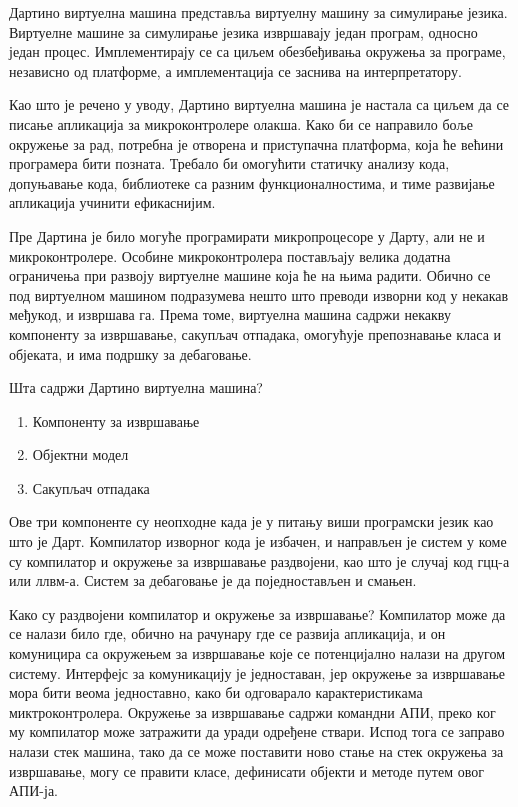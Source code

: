 \documentclass[12pt,oneside]{memoir}
\begin{document}
Дартино виртуелна машина представља виртуелну машину за симулирање језика. Виртуелне машине за симулирање језика извршавају један програм, односно један процес. Имплементирају се са циљем обезбеђивања окружења за програме, независно од платформе, а имплементација се заснива на интерпретатору.

Као што је речено у уводу, Дартино виртуелна машина је настала са циљем да се писање апликација за микроконтролере олакша. Како би се направило боље окружење за рад, потребна је отворена и приступачна платформа, која ће већини програмера бити позната. Требало би омогућити статичку анализу кода, допуњавање кода, библиотеке са разним функционалностима, и тиме развијање апликација учинити ефикаснијим.

Пре Дартина је било могуће програмирати микропроцесоре у Дарту, али не и микроконтролере. Особине микроконтролера постављају велика додатна ограничења при развоју виртуелне машине која ће на њима радити. Обично се под виртуелном машином подразумева нешто што преводи изворни код у некакав међукод, и извршава га. Према томе, виртуелна машина садржи некакву компоненту за извршавање, сакупљач отпадака, омогућује препознавање класа и објеката, и има подршку за дебаговање.

Шта садржи Дартино виртуелна машина?
\begin{enumerate}
\item Компоненту за извршавање
\item Објектни модел
\item Сакупљач отпадака
\end{enumerate}

Ове три компоненте су неопходне када је у питању виши програмски језик као што је Дарт. Компилатор изворног кода је избачен, и направљен је систем у коме су компилатор и окружење за извршавање раздвојени, као што је случај код гцц-а или ллвм-а. Систем за дебаговање је да поједностављен и смањен.

Како су раздвојени компилатор и окружење за извршавање? Компилатор може да се налази било где, обично на рачунару где се развија апликација, и он комуницира са окружењем за извршавање које се потенцијално налази на другом систему. Интерфејс за комуникацију је једноставан, јер окружење за извршавање мора бити веома једноставно, како би одговарало карактеристикама миктроконтролера.
Окружење за извршавање садржи командни АПИ, преко ког му компилатор може затражити да уради одређене ствари. Испод тога се заправо налази стек машина, тако да се може поставити ново стање на стек окружења за извршавање, могу се правити класе, дефинисати објекти и методе путем овог АПИ-ја.
\end{document}
